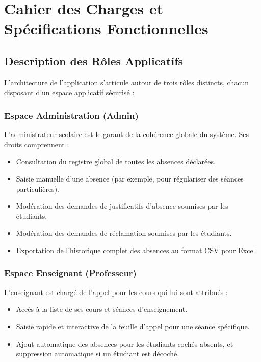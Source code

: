 \documentclass[12pt,a4paper]{article}
\begin{document}
\section{Cahier des Charges et Spécifications Fonctionnelles}

\subsection{Description des Rôles Applicatifs}
L'architecture de l'application s'articule autour de trois rôles distincts, chacun disposant d'un espace applicatif sécurisé :

\subsubsection{Espace Administration (Admin)}
L'administrateur scolaire est le garant de la cohérence globale du système. Ses droits comprennent :
\begin{itemize}
    \item Consultation du registre global de toutes les absences déclarées.
    \item Saisie manuelle d'une absence (par exemple, pour régulariser des séances particulières).
    \item Modération des demandes de justificatifs d'absence soumises par les étudiants.
    \item Modération des demandes de réclamation soumises par les étudiants.
    \item Exportation de l'historique complet des absences au format CSV pour Excel.
\end{itemize}

\subsubsection{Espace Enseignant (Professeur)}
L'enseignant est chargé de l'appel pour les cours qui lui sont attribués :
\begin{itemize}
    \item Accès à la liste de ses cours et séances d'enseignement.
    \item Saisie rapide et interactive de la feuille d'appel pour une séance spécifique.
    \item Ajout automatique des absences pour les étudiants cochés absents, et suppression automatique si un étudiant est décoché.
\end{itemize}
\end{document}
